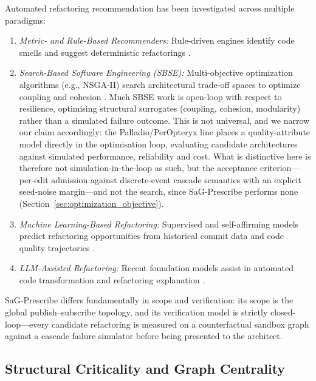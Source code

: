 Automated refactoring recommendation has been investigated across multiple paradigms:
\begin{enumerate}
    \item \emph{Metric- and Rule-Based Recommenders:} Rule-driven engines identify code smells and suggest deterministic refactorings \citep{fowler1999refactoring, suryanarayana2014refactoring}.
    \item \emph{Search-Based Software Engineering (SBSE):} Multi-objective optimization algorithms (e.g., NSGA-II) search architectural trade-off spaces to optimize coupling and cohesion \citep{harman2012sbse, aleti2013software, deb2002fast}. Much SBSE work is open-loop with respect to resilience, optimising structural surrogates (coupling, cohesion, modularity) rather than a simulated failure outcome. This is not universal, and we narrow our claim accordingly: the Palladio/PerOpteryx line \citep{koziolek2011peropteryx} places a quality-attribute model directly in the optimisation loop, evaluating candidate architectures against simulated performance, reliability and cost. What is distinctive here is therefore not simulation-in-the-loop as such, but the acceptance criterion---per-edit admission against discrete-event cascade semantics with an explicit seed-noise margin---and not the search, since SaG-Prescribe performs none (Section~\ref{sec:optimization_objective}).
    \item \emph{Machine Learning-Based Refactoring:} Supervised and self-affirming models predict refactoring opportunities from historical commit data and code quality trajectories \citep{alomar2021can, bavota2012when, ouni2017search}.
    \item \emph{LLM-Assisted Refactoring:} Recent foundation models assist in automated code transformation and refactoring explanation \citep{white2024toward, hou2024large, alkaswan2024automatic}.
\end{enumerate}

SaG-Prescribe differs fundamentally in scope and verification: its scope is the global publish--subscribe topology, and its verification model is strictly closed-loop---every candidate refactoring is measured on a counterfactual sandbox graph against a cascade failure simulator before being presented to the architect.

\subsection{Structural Criticality and Graph Centrality}
\label{sec:related:centrality}

